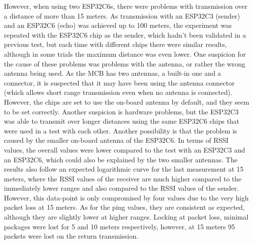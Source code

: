 However, when using two ESP32C6s, there were problems with transmission over a distance of more than 15 meters. As transmission with an ESP32C3 (sender) and an ESP32C6 (echo) was achieved up to 100 meters, the experiment was repeated with the ESP32C6 chip as the sender, which hadn't been validated in a previous test, but each time with different chips there were similar results, although in some trials the maximum distance was even lower. One suspicion for the cause of these problems was problems with the antenna, or rather the wrong antenna being used. As the MCB has two antennas, a built-in one and a connector, it is suspected that it may have been using the antenna connector (which allows short range transmission even when no antenna is connected). However, the chips are set to use the on-board antenna by default, and they seem to be set correctly. Another suspicion is hardware problems, but the ESP32C3 was able to transmit over longer distances using the same ESP32C6 chips that were used in a test with each other. Another possibility is that the problem is caused by the smaller on-board antenna of the ESP32C6. 
In terms of RSSI values, the overall values were lower compared to the test with an ESP32C3 and an ESP32C6, which could also be explained by the two smaller antennas. The results also follow an expected logarithmic curve for the last measurement at 15 meters, where the RSSI values of the receiver are much higher compared to the immediately lower ranges and also compared to the RSSI values of the sender. However, this data-point is only compromised by four values due to the very high packet loss at 15 meters.
As for the ping values, they are consistent as expected, although they are slightly lower at higher ranges.
Locking at packet loss, minimal packages were lost for 5 and 10 meters respectively, however, at 15 meters 95 packets were lost on the return transmission.

